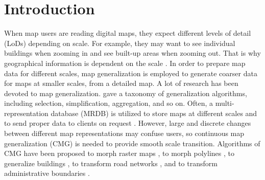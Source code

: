 \documentclass[ijgi,article,submit,moreauthors,pdftex]{Definitions/mdpi}
\begin{document}



\section{Introduction}


When map users are reading digital maps,
they expect different levels of detail (LoDs) depending on scale.
For example, they may want to see individual buildings when zooming in
and see built-up areas when zooming out.
That is why geographical information is dependent on the scale
\citep{Muller1995Generalization,Weibel1997}. 
In order to prepare map data for different scales,
map generalization is employed to generate coarser data 
for maps at smaller scales,
from a detailed map.
A lot of research has been devoted to map generalization.
\citet{Mackaness2017Generalization} gave a taxonomy of 
generalization algorithms, 
including selection, simplification, aggregation, and so on.
Often, a multi-representation database (MRDB) is utilized to store
maps at different scales and to send proper data to clients on request
\citep[\eg][]{Hampe2004multiple}.
However, large and discrete changes between different map representations
may confuse users,
so continuous map generalization (CMG) is needed to
provide smooth scale transition.
Algorithms of CMG have been proposed 
to morph raster maps
\citep[\eg][]{Pantazis2009a,Pantazis2009b}, 
to morph polylines
\citep[\eg][]{Noellenburg2008,Peng2013LSA,Deng2015,Li2017Annealing},
to generalize buildings
\citep[\eg][]{Li2017_Building,Peng2017Building,Touya2017Progressive},
to transform road networks
\citep[\eg][]{Suba2016Road,Chimani2014Eat},
and to transform administrative boundaries
\citep[\eg][]{Peng2016Admin}.
\end{document}
